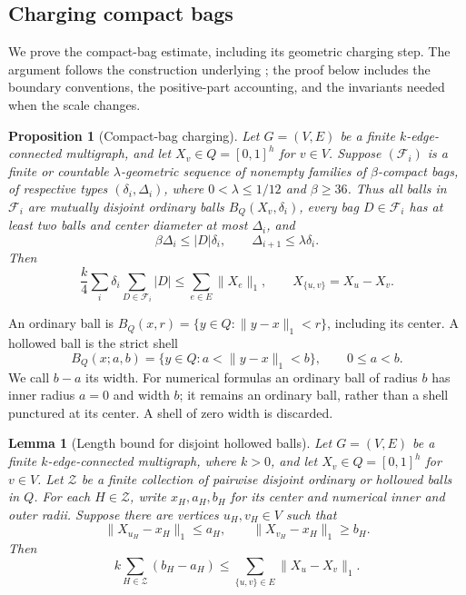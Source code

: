 \documentclass[11pt]{amsart}
\newtheorem{lemma}[theorem]{Lemma}
\newtheorem{proposition}[theorem]{Proposition}
\theoremstyle{definition}
\theoremstyle{remark}
\numberwithin{equation}{section}
\begin{document}
\subsection{Charging compact bags}
\label{hc:section}

We prove the compact-bag estimate, including its geometric charging
step.  The argument follows the construction underlying
\cite[Proposition~7.1 and Section~7.1]{AOG}; the proof below includes the
boundary conventions, the positive-part accounting, and the invariants
needed when the scale changes.

\begin{proposition}[Compact-bag charging]
\label{prop:hierarchy-compact}
Let \(G=(V,E)\) be a finite \(k\)-edge-connected multigraph, and let
\(X_v\in Q=[0,1]^h\) for \(v\in V\).
Suppose \((\mathcal F_i)\) is a finite or countable
\(\lambda\)-geometric sequence of nonempty families of
\(\beta\)-compact bags, of respective types \((\delta_i,\Delta_i)\), where
\(0<\lambda\le 1/12\) and \(\beta\ge36\).  Thus all balls in
\(\mathcal F_i\) are mutually disjoint ordinary balls
\(B_Q(X_v,\delta_i)\), every bag \(D\in\mathcal F_i\) has at least two
balls and center diameter at most \(\Delta_i\), and
\[
 \beta\Delta_i\le |D|\delta_i,
 \qquad
 \Delta_{i+1}\le\lambda\delta_i.
\]
Then
\begin{equation}
\label{hc:conclusion}
 \frac{k}{4}\sum_i\delta_i\sum_{D\in\mathcal F_i}|D|
 \le \sum_{e\in E}\|X_e\|_1,
 \qquad X_{\{u,v\}}=X_u-X_v.
\end{equation}
\end{proposition}

An ordinary ball is \(B_Q(x,r)=\{y\in Q:\|y-x\|_1<r\}\), including
its center.  A hollowed ball is the strict shell
\[
 B_Q(x;a,b)=\{y\in Q:a<\|y-x\|_1<b\},
 \qquad 0\le a<b.
\]
We call \(b-a\) its width.  For numerical formulas an ordinary ball of
radius \(b\) has inner radius \(a=0\) and width \(b\); it remains an
ordinary ball, rather than a shell punctured at its center.  A shell of
zero width is discarded.

\begin{lemma}[Length bound for disjoint hollowed balls]
\label{hc:length}
Let \(G=(V,E)\) be a finite \(k\)-edge-connected multigraph, where
\(k>0\), and let \(X_v\in Q=[0,1]^h\) for \(v\in V\).
Let \(\mathcal Z\) be a finite collection of pairwise disjoint ordinary
or hollowed balls in \(Q\).  For each \(H\in\mathcal Z\), write
\(x_H,a_H,b_H\) for its center and numerical inner and outer radii.
Suppose there are vertices \(u_H,v_H\in V\) such that
\begin{equation}
\label{hc:witness}
 \|X_{u_H}-x_H\|_1\le a_H,
 \qquad \|X_{v_H}-x_H\|_1\ge b_H.
\end{equation}
Then
\begin{equation}
\label{hc:length-bound}
 k\sum_{H\in\mathcal Z}(b_H-a_H)
 \le \sum_{\{u,v\}\in E}\|X_u-X_v\|_1.
\end{equation}
\end{lemma}
\end{document}
